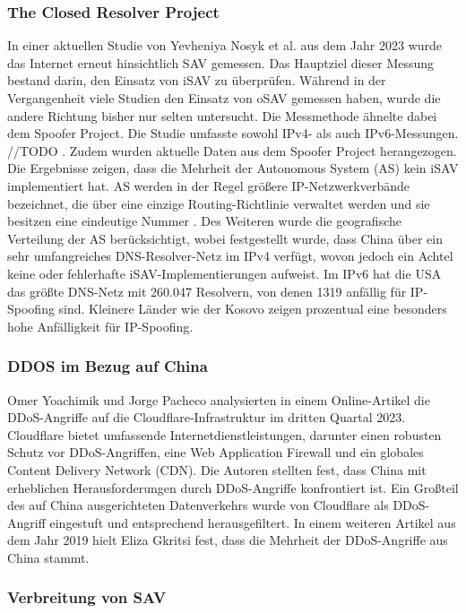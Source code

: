 \documentclass[sigplan,screen]{acmart}
\begin{document}
\subsubsection{The Closed Resolver Project}
In einer aktuellen Studie von Yevheniya Nosyk et al. aus dem Jahr 2023 \cite{CRP01} wurde das Internet erneut hinsichtlich SAV gemessen. Das Hauptziel dieser Messung bestand darin, den Einsatz von iSAV zu überprüfen. Während in der Vergangenheit viele Studien den Einsatz von oSAV gemessen haben, wurde die andere Richtung bisher nur selten untersucht. Die Messmethode ähnelte dabei dem Spoofer Project. Die Studie umfasste sowohl IPv4- als auch IPv6-Messungen. //TODO . Zudem wurden aktuelle Daten aus dem Spoofer Project herangezogen. Die Ergebnisse zeigen, dass die Mehrheit der Autonomous System (AS) kein iSAV implementiert hat. AS werden in der Regel größere IP-Netzwerkverbände bezeichnet, die über eine einzige Routing-Richtlinie verwaltet werden und sie besitzen eine eindeutige Nummer \cite{as01}. Des Weiteren wurde die geografische Verteilung der AS berücksichtigt, wobei festgestellt wurde, dass China über ein sehr umfangreiches DNS-Resolver-Netz im IPv4 verfügt, wovon jedoch ein Achtel keine oder fehlerhafte iSAV-Implementierungen aufweist. Im IPv6 hat die USA das größte DNS-Netz mit 260.047 Resolvern, von denen 1319 anfällig für IP-Spoofing sind. Kleinere Länder wie der Kosovo zeigen prozentual eine besonders hohe Anfälligkeit für IP-Spoofing.

\subsubsection{DDOS im Bezug auf China}

Omer Yoachimik und Jorge Pacheco \cite{cloudflaeDDoS01} analysierten in einem Online-Artikel die DDoS-Angriffe auf die Cloudflare-Infrastruktur im dritten Quartal 2023. Cloudflare bietet umfassende Internetdienstleistungen, darunter einen robusten Schutz vor DDoS-Angriffen, eine Web Application Firewall und ein globales Content Delivery Network (CDN). Die Autoren stellten fest, dass China mit erheblichen Herausforderungen durch DDoS-Angriffe konfrontiert ist. Ein Großteil des auf China ausgerichteten Datenverkehrs wurde von Cloudflare als DDoS-Angriff eingestuft und entsprechend herausgefiltert. In einem weiteren Artikel aus dem Jahr 2019 hielt Eliza Gkritsi \cite{technode01} fest, dass die Mehrheit der DDoS-Angriffe aus China stammt.


\subsubsection{Verbreitung von SAV}
\end{document}
